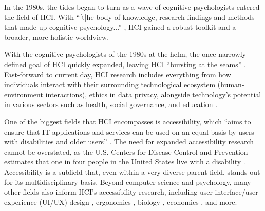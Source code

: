 \documentclass[12pt,twoside]{reedthesis}
\begin{document}
    In the 1980s, the tides began to turn as a wave of cognitive psychologists entered the field of HCI. With \enquote{[t]he body of knowledge, research findings and methods that made up cognitive psychology...} \cite{rogers_new_nodate}, HCI gained a robust toolkit and a broader, more holistic worldview.

    With the cognitive psychologists of the 1980s at the helm, the once narrowly-defined goal of HCI quickly expanded, leaving HCI \enquote{bursting at the seams} \cite{rogers_new_nodate}. Fast-forward to current day, HCI research includes everything from how individuals interact with their surrounding technological ecosystem (human-environment interactions), ethics in data privacy, alongside technology's potential in various sectors such as health, social governance, and education \cite{stephanidis_seven_2019}. 
    
    One of the biggest fields that HCI encompasses is accessibility, which \enquote{aims to ensure that IT applications and services can be used on an equal basis by users with disabilities and older users} \cite{stephanidis_seven_2019}. The need for expanded accessibility research cannot be overstated, as the U.S. Centers for Disease Control and Prevention estimates that one in four people in the United States live with a disability \cite{putnam_it_2023}. Accessibility is a subfield that, even within a very diverse parent field, stands out for its multidisciplinary basis. Beyond computer science and psychology, many other fields also inform HCI's accessibility research, including user interface/user experience (UI/UX) design \cite{putnam_it_2023}, ergonomics \cite{myers_brief_1998}, biology \cite{lindberg_how_2006, cruz_user-centered_2023}, economics \cite{nadkarni_task-based_2007}, and more.
\end{document}
